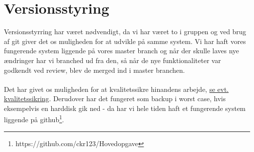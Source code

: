 \section{Versionsstyring}
Versionsstyrring har været nødvendigt, da vi har været to i gruppen og ved brug af git giver det os
muligheden for at udvikle på samme system. 
Vi har haft vores fungerende system liggende på vores master branch og når der skulle laves nye ændringer har vi branched ud fra den, så når de nye funktionaliteter var godkendt ved review, blev de merged ind i master branchen.
\\\\
Det har givet os muligheden for at kvalitetssikre hinandens arbejde, \hyperlink{kvalitetssikring}{se evt. kvalitetssikring}.
Derudover har det fungeret som backup i worst case, hvis eksempelvis en harddisk gik ned
- da har vi hele tiden haft et fungerende system liggende på github\footnote{https://github.com/ckr123/Hovedopgave}. 
